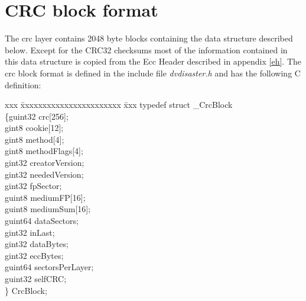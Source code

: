
\newpage
\section{CRC block format}
\label{crc-block}

The crc layer contains 2048 byte blocks containing the data structure
described below. Except for the CRC32 checksums most of the information
contained in this data structure is copied from the Ecc Header described
in appendix \ref{eh}. The crc block format is defined in the include 
file {\em dvdisaster.h} and has the following C definition:

\begin{tabbing}
 xxx \= xxxxxxxxxxxxxxxxxxxxxxx \= xxx \kill
typedef struct \_CrcBlock \\
\{\>guint32 crc[256];           \\
\> gint8 cookie[12];            \\
\> gint8 method[4];             \\
\> gint8 methodFlags[4];        \\
\> gint32 creatorVersion;       \\
\> gint32 neededVersion;        \\
\> gint32 fpSector;             \\
\> guint8 mediumFP[16];         \\ 
\> guint8 mediumSum[16];        \\
\> guint64 dataSectors;         \\
\> gint32 inLast;               \\
\> gint32 dataBytes;            \\
\> gint32 eccBytes;             \\
\> guint64 sectorsPerLayer;     \\
\> guint32 selfCRC;             \\
\} CrcBlock;
\end{tabbing}

